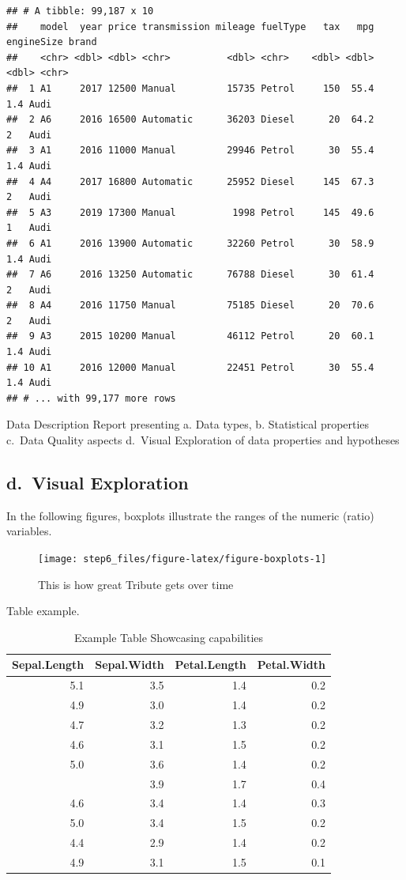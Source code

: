 \documentclass[sigchi]{acmart}
\begin{document}
\begin{verbatim}
## # A tibble: 99,187 x 10
##    model  year price transmission mileage fuelType   tax   mpg engineSize brand
##    <chr> <dbl> <dbl> <chr>          <dbl> <chr>    <dbl> <dbl>      <dbl> <chr>
##  1 A1     2017 12500 Manual         15735 Petrol     150  55.4        1.4 Audi 
##  2 A6     2016 16500 Automatic      36203 Diesel      20  64.2        2   Audi 
##  3 A1     2016 11000 Manual         29946 Petrol      30  55.4        1.4 Audi 
##  4 A4     2017 16800 Automatic      25952 Diesel     145  67.3        2   Audi 
##  5 A3     2019 17300 Manual          1998 Petrol     145  49.6        1   Audi 
##  6 A1     2016 13900 Automatic      32260 Petrol      30  58.9        1.4 Audi 
##  7 A6     2016 13250 Automatic      76788 Diesel      30  61.4        2   Audi 
##  8 A4     2016 11750 Manual         75185 Diesel      20  70.6        2   Audi 
##  9 A3     2015 10200 Manual         46112 Petrol      20  60.1        1.4 Audi 
## 10 A1     2016 12000 Manual         22451 Petrol      30  55.4        1.4 Audi 
## # ... with 99,177 more rows
\end{verbatim}

Data Description Report presenting
a. Data types,
b. Statistical properties
c.~Data Quality aspects
d.~Visual Exploration of data properties and hypotheses

\hypertarget{d.-visual-exploration}{%
\subsection{d.~Visual Exploration}\label{d.-visual-exploration}}

In the following figures, boxplots illustrate the ranges of the numeric (ratio) variables.

\begin{figure}
\texttt{[image: step6\_files/figure-latex/figure-boxplots-1]} \caption{This is how great Tribute gets over time}\label{fig:figure-boxplots}
\end{figure}

Table example.

\begin{table}

\caption{\label{tab:table-iris}Example Table Showcasing capabilities}
\centering
\begin{tabular}[t]{rrrr}
\toprule
Sepal.Length & Sepal.Width & Petal.Length & Petal.Width\\
\midrule
5.1 & 3.5 & 1.4 & 0.2\\
4.9 & 3.0 & 1.4 & 0.2\\
4.7 & 3.2 & 1.3 & 0.2\\
4.6 & 3.1 & 1.5 & 0.2\\
5.0 & 3.6 & 1.4 & 0.2\\
\addlinespace
5.4 & 3.9 & 1.7 & 0.4\\
4.6 & 3.4 & 1.4 & 0.3\\
5.0 & 3.4 & 1.5 & 0.2\\
4.4 & 2.9 & 1.4 & 0.2\\
4.9 & 3.1 & 1.5 & 0.1\\
\bottomrule
\end{tabular}
\end{table}
\end{document}
